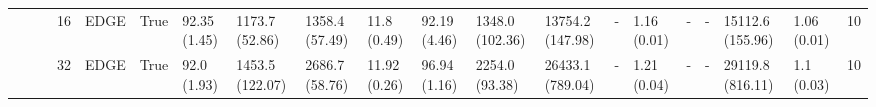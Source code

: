 \begin{tabular}{lllllllllllllllllllr}
                  &      &           & 16 & EDGE & True &              92.35 (1.45) &               1173.7 (52.86) &                1358.4 (57.49) &                  11.8 (0.49) &          92.19 (4.46) &          1348.0 (102.36) &          13754.2 (147.98) &              - &              1.16 (0.01) &                - &             - &   15112.6 (155.96) &          1.06 (0.01) &     10 \\
                  &      &           & 32 & EDGE & True &               92.0 (1.93) &              1453.5 (122.07) &                2686.7 (58.76) &                 11.92 (0.26) &          96.94 (1.16) &           2254.0 (93.38) &          26433.1 (789.04) &              - &              1.21 (0.04) &                - &             - &   29119.8 (816.11) &           1.1 (0.03) &     10 \\
\bottomrule
\end{tabular}